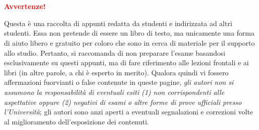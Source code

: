 \chapter*{}

\vspace*{0.2\paperheight}
\begin{center}
    \textcolor{red}{\textbf{\Huge Avvertenze!}}\\
    \begin{center}
    
    \end{center}
    Questa è una raccolta di appunti redatta da studenti e indirizzata
    ad altri studenti. Essa non pretende di essere un libro
    di testo, ma unicamente una forma di aiuto libero e gratuito per coloro
    che sono in cerca di materiale per il supporto allo studio.
    Pertanto, si raccomanda di non preparare l'esame basandosi esclusivamente
    su questi appunti, ma di fare riferimento alle lezioni frontali
    e ai libri (in altre parole, a chi è esperto in merito). Qualora quindi
    vi fossero affermazioni fuorvianti o false contenute in queste
    pagine, \textit{gli autori non si assumono la responsabilità di eventuali
    esiti (1) non corrispondenti alle aspettative oppure (2) negativi di esami
    o altre forme di prove ufficiali presso l'Università}; gli autori sono anzi
    aperti a eventuali segnalazioni e correzioni volte al miglioramento
    dell'esposizione dei contenuti.
\end{center}